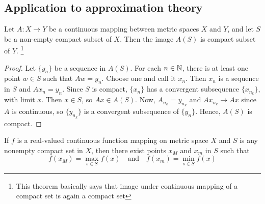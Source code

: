 \subsection{Application to approximation theory}
\begin{theorem}
    Let $A:X \to Y$ be a continuous mapping between metric spaces $X$ and $Y$, and let $S$ be a non-empty compact subset of $X$. Then the image $A(S)$ is compact subset of $Y$.
    \footnote{This theorem basically says that image under continuous mapping of a compact set is again a compact set}
\end{theorem}
\begin{proof}
    Let $\{y_n\}$ be a sequence in $A(S)$. For each $n \in \mathbb N$, there is at least one point $w \in S$ such that $Aw = y_n$. Choose one and call it $x_n$. Then $x_n$ is a sequence in $S$ and $Ax_n = y_n$. Since $S$ is compact, $\{x_n\}$ has a convergent subsequence $\{x_{n_k} \}$, with limit $x$. Then $x \in S$, so $Ax \in A(S)$. Now, $A_{n_k} = y_{n_k}$ and $Ax_{n_k} \to Ax$ since $A$ is continuous, so $\{ y_{n_k} \}$ is a convergent subsequence of $\{ y_n \}$.
    Hence, $A(S)$ is compact.
\end{proof}

\begin{theorem}
    If $f$ is a real-valued continuous function mapping on metric space $X$ and $S$ is any nonempty compact set in $X$, then there exist points $x_{M}$ and $x_{m}$ in $S$ such that 
    $$
    f(x_M) = \max_{s \in S} f(x) \quad \text{and} \quad f(x_m) = \min_{s \in S} f(x)
    $$
\end{theorem}


